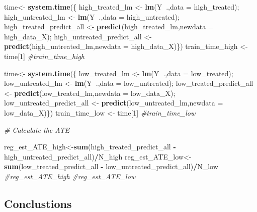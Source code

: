 \documentclass[]{article}
\newenvironment{Shaded}{\begin{snugshade}}{\end{snugshade}}
\newcommand{\CommentTok}[1]{\textcolor[rgb]{0.56,0.35,0.01}{\textit{#1}}}
\newcommand{\DataTypeTok}[1]{\textcolor[rgb]{0.13,0.29,0.53}{#1}}
\newcommand{\DecValTok}[1]{\textcolor[rgb]{0.00,0.00,0.81}{#1}}
\newcommand{\KeywordTok}[1]{\textcolor[rgb]{0.13,0.29,0.53}{\textbf{#1}}}
\newcommand{\NormalTok}[1]{#1}
\newcommand{\OperatorTok}[1]{\textcolor[rgb]{0.81,0.36,0.00}{\textbf{#1}}}
\newcommand{\StringTok}[1]{\textcolor[rgb]{0.31,0.60,0.02}{#1}}
\begin{document}
\begin{Shaded}
\begin{Highlighting}[]
\NormalTok{time<-}\StringTok{ }\KeywordTok{system.time}\NormalTok{(\{}
\NormalTok{  high_treated_lm <-}\StringTok{ }\KeywordTok{lm}\NormalTok{(Y}\OperatorTok{~}\NormalTok{.,}\DataTypeTok{data =}\NormalTok{ high_treated);}
\NormalTok{  high_untreated_lm <-}\StringTok{ }\KeywordTok{lm}\NormalTok{(Y}\OperatorTok{~}\NormalTok{.,}\DataTypeTok{data =}\NormalTok{ high_untreated);}
\NormalTok{  high_treated_predict_all <-}\StringTok{ }\KeywordTok{predict}\NormalTok{(high_treated_lm,}\DataTypeTok{newdata =}\NormalTok{ high_data_X);}
\NormalTok{  high_untreated_predict_all <-}\StringTok{ }\KeywordTok{predict}\NormalTok{(high_untreated_lm,}\DataTypeTok{newdata =}\NormalTok{ high_data_X)\})}
\NormalTok{train_time_high <-}\StringTok{ }\NormalTok{time[}\DecValTok{1}\NormalTok{]}
\CommentTok{#train_time_high}

\NormalTok{time<-}\StringTok{ }\KeywordTok{system.time}\NormalTok{(\{}
\NormalTok{  low_treated_lm <-}\StringTok{ }\KeywordTok{lm}\NormalTok{(Y}\OperatorTok{~}\NormalTok{.,}\DataTypeTok{data =}\NormalTok{ low_treated);}
\NormalTok{  low_untreated_lm <-}\StringTok{ }\KeywordTok{lm}\NormalTok{(Y}\OperatorTok{~}\NormalTok{.,}\DataTypeTok{data =}\NormalTok{ low_untreated);}
\NormalTok{  low_treated_predict_all <-}\StringTok{ }\KeywordTok{predict}\NormalTok{(low_treated_lm,}\DataTypeTok{newdata =}\NormalTok{ low_data_X);}
\NormalTok{  low_untreated_predict_all <-}\StringTok{ }\KeywordTok{predict}\NormalTok{(low_untreated_lm,}\DataTypeTok{newdata =}\NormalTok{ low_data_X)\})}
\NormalTok{train_time_low <-}\StringTok{ }\NormalTok{time[}\DecValTok{1}\NormalTok{]}
\CommentTok{#train_time_low}

\CommentTok{# Calculate the ATE}

\NormalTok{reg_est_ATE_high<-}\KeywordTok{sum}\NormalTok{(high_treated_predict_all }\OperatorTok{-}\StringTok{ }\NormalTok{high_untreated_predict_all)}\OperatorTok{/}\NormalTok{N_high}
\NormalTok{reg_est_ATE_low<-}\KeywordTok{sum}\NormalTok{(low_treated_predict_all }\OperatorTok{-}\StringTok{ }\NormalTok{low_untreated_predict_all)}\OperatorTok{/}\NormalTok{N_low}
\CommentTok{#reg_est_ATE_high}
\CommentTok{#reg_est_ATE_low}
\end{Highlighting}
\end{Shaded}

\hypertarget{conclustions}{%
\subsection{Conclustions}\label{conclustions}}
\end{document}
